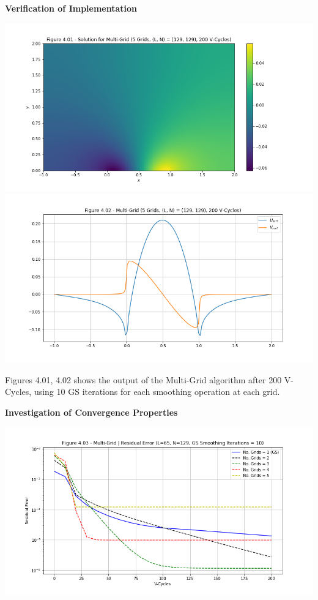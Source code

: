 \documentclass[12pt]{article}
\begin{document}
    \newpage
    \textbf{Verification of Implementation}

    \includegraphics[width=\textwidth]{fig4.01}
    \includegraphics[width=\textwidth]{fig4.02}

    Figures 4.01, 4.02 shows the output of the Multi-Grid algorithm after 200 V-Cycles, using 10 GS iterations for each smoothing operation at each grid.

    \newpage
    \textbf{Investigation of Convergence Properties}

    \includegraphics[width=\textwidth]{fig4.03}
\end{document}
